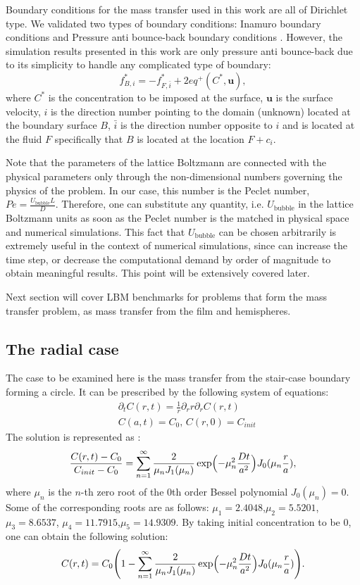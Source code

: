 \documentclass{article}
\newcommand{\beq}{\begin{equation}}
\newcommand{\feq}{\end{equation}}
\newcommand{\ububble}{U_{\mathrm{bubble}}}
\newcommand{\cstar}{C^{*}}
\begin{document}
Boundary conditions for the mass transfer used in this work are all of Dirichlet type. We validated
two types of boundary conditions: Inamuro boundary conditions \cite{inamuro-scalar-boundary} and
Pressure anti bounce-back boundary conditions \cite{ginzburg-multireflection}. However, the
simulation results presented in this work are only pressure anti bounce-back due to its simplicity
to handle any complicated type of boundary:
\beq
\label{antibb}
f^{*}_{B,i}=-f^{*}_{F,\bar{i}} + 2 eq^+(\cstar,\bm{u}),
\feq
where $\cstar$ is the concentration to be imposed at the surface, $\bm{u}$ is the surface velocity,
$i$ is the direction number pointing to the domain (unknown) located at the boundary surface $B$,
$\bar{i}$ is the direction number opposite to $i$ and is located at the fluid $F$ specifically that
$B$ is located at the location $F+c_i$. 

Note that the parameters of the lattice
Boltzmann are connected with the physical parameters only through the non-dimensional
numbers governing the physics of the problem. In our case, this number is the Peclet number, $Pe=\frac{\ububble L}{D}$.
Therefore, one can substitute any quantity, i.e.
$\ububble$ in the lattice Boltzmann units as soon as the
Peclet number is the matched in physical space and numerical simulations. This fact that $\ububble$ can be chosen arbitrarily is extremely useful in the context of numerical simulations, since can increase the time step, or decrease the computational demand by order of magnitude to obtain meaningful results. This point will be extensively covered later. 

Next section will cover LBM benchmarks for problems that form the mass transfer problem, as mass transfer from the film  and hemispheres.

\subsection{The radial case}
The case to be examined here is the mass transfer from the stair-case boundary forming a circle. It
can be
prescribed by the following system of equations:
\beq
\begin{aligned}
&\partial_t C(r,t)=\frac{1}{r}\partial_r r \partial_r C(r,t)\\
&C(a,t)=C_0,\,C(r,0)=C_{init}
\end{aligned}
\feq 
The solution is represented as \cite{chemical-correlations}:
\beq
\frac{C(r,t)-C_{0}}{C_{init}-C_{0}}=\sum_{n=1}^{\infty}{\frac{2}{\mu_n
J_1(\mu_n)}\exp\Bigl(-\mu_n^2 \frac{D t}{a^2} \Bigr)J_0(\mu_n \frac{r}{a})},
\feq
where $\mu_n$ is the $n$-th zero root of the $0$th order Bessel polynomial $J_0(\mu_n)=0$. Some of
the corresponding roots are as follows: $\mu_1=2.4048$,$\mu_2=5.5201$,$\mu_3=8.6537$,
$\mu_4=11.7915$,$\mu_5=14.9309$.
By taking initial concentration to be $0$, one can obtain the following solution:
\beq
C(r,t)=C_0 \Biggl(1 - \sum_{n=1}^{\infty}{\frac{2}{\mu_n
J_1(\mu_n)}\exp\Bigl(-\mu_n^2 \frac{D t}{a^2} \Bigr)J_0(\mu_n \frac{r}{a})}\Biggr).
\feq
\end{document}
